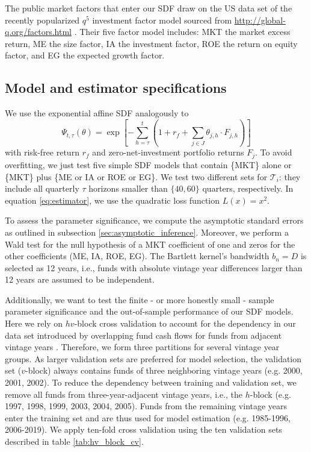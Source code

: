 \documentclass[12pt]{article}
\begin{document}
The public market factors that enter our SDF draw on the US data set of the recently popularized $q^5$ investment factor model sourced from \url{http://global-q.org/factors.html} \citep{HXZ15,HXZ20}. 
Their five factor model includes: MKT the market excess return, ME the size factor, IA the investment factor, ROE the return on equity factor, and EG the expected growth factor.


\subsection{Model and estimator specifications}
\label{sec:model_selection}

We use the exponential affine SDF analogously to \cite{KN16}
\begin{equation}
\label{eq:SDF}
\Psi_{t,\tau} (\theta) = 
\exp
\left[
-
\sum_{h=\tau}^{t} \left( 1 + r_f + \sum_{j \in J} \theta_{j,h} \cdot F_{j,h} \right)
\right]
\end{equation}
with risk-free return $r_f$ and zero-net-investment portfolio returns $F_j$.
To avoid overfitting, we just test five simple SDF models that contain \{MKT\} alone or \{MKT\} plus \{ME or IA or ROE or EG\}.
We test two different sets for $\mathcal{T}_i$: they include all quarterly $\tau$ horizons smaller than $\{40, 60\}$ quarters, respectively.
In equation \ref{eq:estimator}, we use the quadratic loss function $L(x)=x^2$.

To assess the parameter significance, we compute the asymptotic standard errors as outlined in subsection \ref{sec:asymptotic_inference}.
Moreover, we perform a Wald test for the null hypothesis of a MKT coefficient of one and zeros for the other coefficients (ME, IA, ROE, EG).
The Bartlett kernel's bandwidth $b_n=D$ is selected as 12 years, i.e., funds with absolute vintage year differences larger than 12 years are assumed to be independent.

Additionally, we want to test the finite - or more honestly small - sample parameter significance and the out-of-sample performance of our SDF models.
Here we rely on $hv$-block cross validation to account for the dependency in our data set introduced by overlapping fund cash flows for funds from adjacent vintage years \citep{R00}. 
Therefore, we form three partitions for several vintage year groups. 
As larger validation sets are preferred for model selection, the validation set ($v$-block) always contains funds of three neighboring vintage years (e.g. 2000, 2001, 2002). 
To reduce the dependency between training and validation set, we remove all funds from three-year-adjacent vintage years, i.e., the $h$-block (e.g. 1997, 1998, 1999, 2003, 2004, 2005). 
Funds from the remaining vintage years enter the training set and are thus used for model estimation (e.g. 1985-1996, 2006-2019).
We apply ten-fold cross validation using the ten validation sets described in table \ref{tab:hv_block_cv}.
\end{document}

